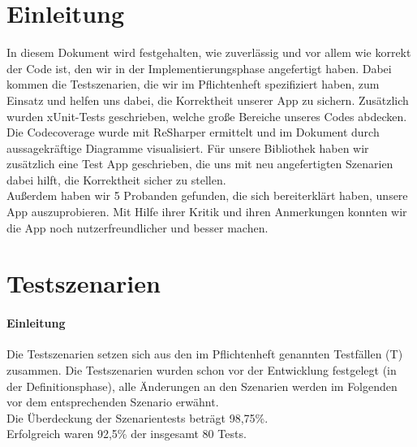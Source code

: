 \documentclass[a4paper,12pt]{article}
\title{\projektName}
\date{\today}
\author{Tec O'Brain}
\newcommand{\testok}[0]{
	\cellcolor{green!25} OK
}
\begin{document}
\setcounter{page}{2}
\tableofcontents          %
\clearpage
{}

\section{Einleitung}
In diesem Dokument wird festgehalten, wie zuverlässig und vor allem wie korrekt der Code ist, den wir in der Implementierungsphase angefertigt haben.
Dabei kommen die Testszenarien, die wir im Pflichtenheft spezifiziert haben, zum Einsatz und helfen uns dabei, die Korrektheit unserer App zu sichern.
Zusätzlich wurden xUnit-Tests geschrieben, welche große Bereiche unseres Codes abdecken.\\
Die Codecoverage wurde mit ReSharper ermittelt und im Dokument durch aussagekräftige Diagramme visualisiert.
Für unsere Bibliothek haben wir zusätzlich eine Test App geschrieben, die uns mit neu angefertigten Szenarien dabei hilft, die Korrektheit sicher zu stellen.\\
Außerdem haben wir 5 Probanden gefunden, die sich bereiterklärt haben, unsere App auszuprobieren.
Mit Hilfe ihrer Kritik und ihren Anmerkungen konnten wir die App noch nutzerfreundlicher und besser machen.
\section{Testszenarien}

\paragraph{Einleitung}
Die Testszenarien setzen sich aus den im Pflichtenheft genannten Testfällen (T) zusammen.
Die Testszenarien wurden schon vor der Entwicklung festgelegt (in der Definitionsphase), alle Änderungen an den Szenarien werden im Folgenden vor dem entsprechenden Szenario erwähnt.
\\
Die Überdeckung der Szenarientests beträgt 98,75\%.\\
Erfolgreich waren 92,5\% der insgesamt 80 Tests.
\end{document}

